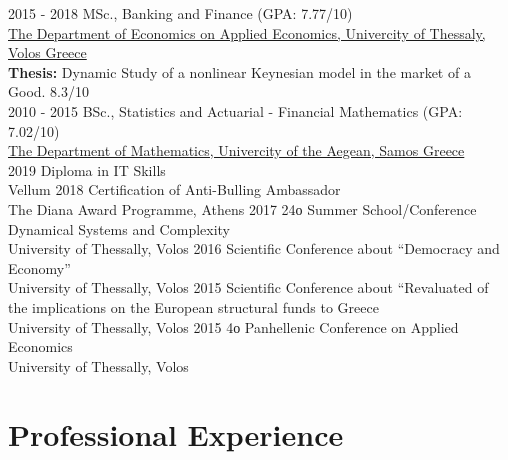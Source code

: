 \documentclass[letterpaper]{engineer_cv} %
\begin{document}
	\begin{longList} %
		\longListItem
			{2015 - 2018}
			{}
			{MSc., Banking and Finance \textnormal{(GPA: 7.77/10)}}
			{\\\href{https://www.econ.uth.gr/}{The Department of Economics on Applied Economics, Univercity of Thessaly, Volos Greece}\\{{\bf Thesis:} Dynamic Study of a nonlinear Keynesian model in the market of a Good. 8.3/10}}
			{}
			{}
			\\
		\longListItem
			{2010 - 2015}
			{}
			{BSc., Statistics and Actuarial - Financial Mathematics \textnormal{(GPA: 7.02/10)}}
			{\\\href{https://www.math.aegean.gr/}{The Department of Mathematics, Univercity of the Aegean, Samos Greece}}
			{}
			{}
			\\
		\longListItem
			{2019}
			{}
			{Diploma in IT Skills}
			{\\Vellum}
			{}
			{}
		\longListItem
			{2018}
			{}
			{Certification of Anti-Bulling Ambassador}
			{\\The Diana Award Programme, Athens}
			{}
			{}
		\longListItem
			{2017}
			{}
			{24ο Summer School/Conference Dynamical Systems and Complexity}
			{\\University of Thessally, Volos}
			{}
			{}
		\longListItem
			{2016}
			{}
			{Scientific Conference about “Democracy and Economy”}
			{\\University of Thessally, Volos}
			{}
			{}
		\longListItem
			{2015}
			{}
			{Scientific Conference about “Revaluated of the implications on the European structural funds to Greece}
			{\\University of Thessally, Volos}
			{}
			{}
		\longListItem
			{2015}
			{}
			{4ο Panhellenic Conference on Applied Economics}
			{\\University of Thessally, Volos}
			{}
			{}
	\end{longList}



	\section{Professional Experience}
\end{document}
